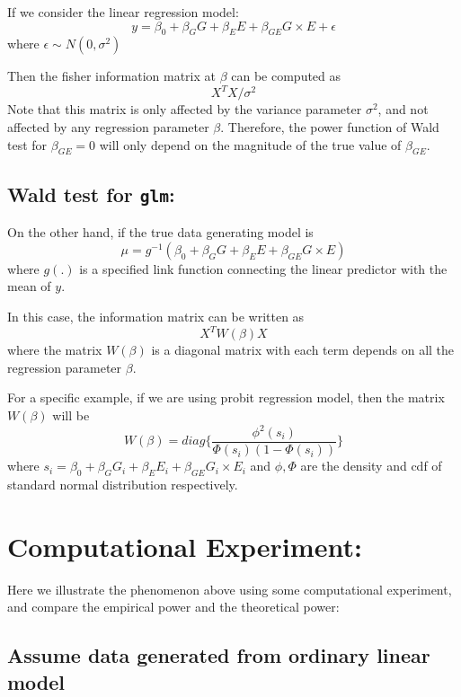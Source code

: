 \documentclass[
]{article}
\begin{document}
If we consider the linear regression model:
\[y = \beta_0 + \beta_GG +\beta_EE+\beta_{GE}G\times E+\epsilon\] where
\(\epsilon \sim N(0,\sigma^2)\)

Then the fisher information matrix at \(\beta\) can be computed as
\[X^TX/\sigma^2\] Note that this matrix is only affected by the variance
parameter \(\sigma^2\), and not affected by any regression parameter
\(\beta\). Therefore, the power function of Wald test for
\(\beta_{GE}=0\) will only depend on the magnitude of the true value of
\(\beta_{GE}\).

\hypertarget{wald-test-for-glm}{%
\subsection{\texorpdfstring{Wald test for
\texttt{glm}:}{Wald test for glm:}}\label{wald-test-for-glm}}

On the other hand, if the true data generating model is
\[\mu = g^{-1}(\beta_0 + \beta_GG +\beta_EE+\beta_{GE}G\times E)\] where
\(g(.)\) is a specified link function connecting the linear predictor
with the mean of \(y\).

In this case, the information matrix can be written as \[X^TW(\beta)X\]
where the matrix \(W(\beta)\) is a diagonal matrix with each term
depends on all the regression parameter \(\beta\).

For a specific example, if we are using probit regression model, then
the matrix \(W(\beta)\) will be
\[W(\beta) = diag\bigg\{\frac{\phi^2(s_i)}{\Phi(s_i)(1-\Phi(s_i))}\bigg\}\]
where \(s_i = \beta_0 + \beta_GG_i +\beta_EE_i+\beta_{GE}G_i\times E_i\)
and \(\phi,\Phi\) are the density and cdf of standard normal
distribution respectively.

\clearpage

\hypertarget{computational-experiment}{%
\section{Computational Experiment:}\label{computational-experiment}}

Here we illustrate the phenomenon above using some computational
experiment, and compare the empirical power and the theoretical power:

\hypertarget{assume-data-generated-from-ordinary-linear-model}{%
\subsection{Assume data generated from ordinary linear
model}\label{assume-data-generated-from-ordinary-linear-model}}
\end{document}
